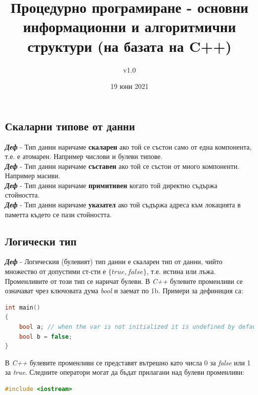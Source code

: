 \documentclass[fleqn,12pt]{article}
\title{Процедурно програмиране - основни информационни и алгоритмични структури (на базата на C++)}
\author{v1.0}
\date{19 юни 2021}
\begin{document}
\maketitle

\tableofcontents
\pagebreak

\begin{flushleft}

\section{Скаларни типове от данни}

\textit{\textbf{Деф}} - Тип данни наричаме \textbf{скаларен} ако той се състои само от една компонента, т.е. е атомарен. Например числови и булеви типове. \\
\textit{\textbf{Деф}} - Тип данни наричаме \textbf{съставен} ако той се състои от много компоненти. Например масиви. \\
\textit{\textbf{Деф}} - Тип данни наричаме \textbf{примитивен} когато той директно съдържа стойността. \\
\textit{\textbf{Деф}} - Тип данни наричаме \textbf{указател} ако той съдържа адреса към локацията в паметта където се пази стойността. \\

\subsection{Логически тип}

\textit{\textbf{Деф}} - Логическия (булевият) тип данни е скаларен тип от данни, чийто множество от допустими ст-сти е $\{true, false\}$, т.е. истина или лъжа. 
Променливите от този тип се наричат булеви.
\bigbreak
В \textit{C++} булевите променливи се означават чрез ключовата дума \textit{bool} и заемат по 1b. Примери за дефиниция са:

\begin{lstlisting}[language=C++, caption=Bool variables]
int main()
{
    bool a; // when the var is not initialized it is undefined by default
    bool b = false;
}
\end{lstlisting}

В \textit{C++} булевите променливи се представят вътрешно като числа 0 за \textit{false} или 1 за \textit{true}.
Следните оператори могат да бъдат прилагани над булеви променливи:

\begin{lstlisting}[language=C++, caption=Bool operators]
#include <iostream>


\end{lstlisting}
\end{flushleft}
\end{document}
